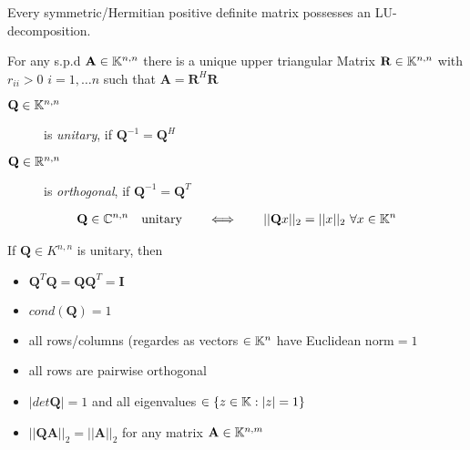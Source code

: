 		\begin{theorem}
		 Every symmetric/Hermitian positive definite matrix possesses an LU-decomposition.
		\end{theorem}

		\begin{lemma}
		 For any s.p.d $\mathbf{A} \in \mathbb{K}^{n,n}$ there is a unique upper triangular Matrix $\mathbf R \in \mathbb{K}^{n,n}$ with $r_{ii} > 0$ $i=1, \ldots n$ such that $\mathbf A = \mathbf{R}^H \mathbf R$
		\end{lemma}
		
		\begin{definition}
			\begin{description}
			 \item[$\mathbf Q \in \mathbb{K}^{n,n}$] is \emph{unitary}, if $\mathbf Q^{-1} = \mathbf Q^H$
			 \item[$\mathbf Q \in \mathbb{R}^{n,n}$] is \emph{orthogonal}, if $\mathbf Q^{-1} = \mathbf Q^T$
			\end{description}
		\end{definition}
		
		\begin{theorem}
		 \begin{align*}
		  \mathbf Q \in \mathbb{C}^{n,n} \quad \text{unitary} \qquad \Longleftrightarrow \qquad ||\mathbf Q x ||_2 = ||x||_2\ \forall x \in \mathbb{K}^n
		 \end{align*}
		\end{theorem}
				
		\begin{notice}
		 If $\mathbf Q \in K^{n,n}$ is unitary, then
		 \begin{itemize}
		  \item $\mathbf Q^T \mathbf Q = \mathbf Q \mathbf Q^T = \mathbf I$
		  \item $cond(\mathbf Q) = 1$
		  \item all rows/columns (regardes as vectors $\in \mathbb{K}^n$ have Euclidean norm$=1$
		  \item all rows are pairwise orthogonal
		  \item $|det \mathbf Q| = 1$ and all eigenvalues $\in \{z \in \mathbb{K}: |z| = 1\}$
		  \item $||\mathbf{QA}||_2 = ||\mathbf A||_2$ for any matrix $\mathbf A \in \mathbb{K}^{n,m}$
		 \end{itemize}

		\end{notice}





